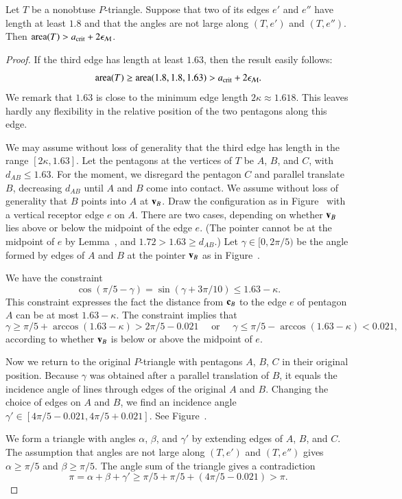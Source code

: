 \begin{lemma} 
  Let $T$ be a nonobtuse $P$-triangle.  Suppose that two of its edges
  $e'$ and $e''$ have length at least $1.8$ and that the angles are
  not large along $(T,e')$ and $(T,e'')$.  Then ${\operatorname{area}}(T) > a_\text{crit} +
  2\epsilon_{\mathcal M}$.
\end{lemma}

\begin{proof}  
  If the third edge has length at least $1.63$, then the result easily
  follows:
\[
{\operatorname{area}}(T) \ge {\operatorname{area}}(1.8,1.8,1.63) > a_\text{crit} + 2\epsilon_{\mathcal M}.
\]
We remark that $1.63$ is close to the minimum edge length
$2\kappa\approx 1.618$.  This leaves hardly any flexibility in the
relative position of the two pentagons along this edge.

We may assume without loss of generality that the third edge has
length in the range $[2\kappa,1.63]$.  Let the pentagons at the
vertices of $T$ be $A$, $B$, and $C$, with $d_{AB}\le 1.63$.  For the
moment, we disregard the pentagon $C$ and parallel translate $B$,
decreasing $d_{AB}$ until $A$ and $B$ come into contact.  We assume
without loss of generality that $B$ points into $A$ at ${\mathbf v}_B$.  Draw
the configuration as in Figure~ with a vertical
receptor edge $e$ on $A$.  There are two cases, depending on whether
${\mathbf v}_B$ lies above or below the midpoint of the edge $e$.  (The pointer
cannot be at the midpoint of $e$ by Lemma~, and
$1.72 > 1.63 \ge d_{AB}$.)  Let $\gamma\in[0,2\pi/5)$ be the angle
formed by edges of $A$ and $B$ at the pointer ${\mathbf v}_B$ as in
Figure~.

We have the constraint
\[
\cos(\pi/5 - \gamma) =\sin(\gamma+3\pi/10) \le 1.63 - \kappa.
\]
This constraint expresses the fact the distance from ${\mathbf c}_B$ to the
edge $e$ of pentagon $A$ can be at most $1.63-\kappa$.  The constraint
implies that
\[
\gamma \ge \pi/5 +
\arccos (1.63-\kappa) > 2\pi/5 - 0.021\quad \text{ or }\quad
\gamma\le \pi/5 - \arccos(1.63-\kappa) < 0.021,
\]
according to whether ${\mathbf v}_B$ is below or above the midpoint of $e$.

Now we return to the original $P$-triangle with pentagons $A$, $B$,
$C$ in their original position.  Because $\gamma$ was obtained after a
parallel translation of $B$, it equals the incidence angle of lines
through edges of the original $A$ and $B$.  Changing the choice of
edges on $A$ and $B$, we find an incidence angle  $\gamma' \in
[4\pi/5-0.021,4\pi/5+0.021]$.  See Figure~.

We form a triangle with angles $\alpha$, $\beta$, and $\gamma'$ by
extending edges of $A$, $B$, and $C$.  The assumption that angles are
not large along $(T,e')$ and $(T,e'')$ gives $\alpha\ge \pi/5$ and
$\beta\ge \pi/5$.  The angle sum of the triangle gives a contradiction
\[
\pi=\alpha+\beta+\gamma' 
\ge  \pi/5 + \pi/5 + (4\pi/5 - 0.021) > \pi.
\]
\end{proof}


